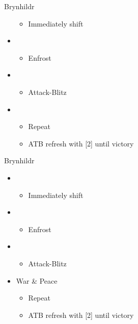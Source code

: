 \begin{paracol}{2}
\begin{battle}{Brynhildr}
\begin{itemize}
\begin{itemize}
				      \item Immediately shift
			      \end{itemize}
			\item \third
			      \begin{itemize}
				      \item Enfrost
			      \end{itemize}
			\item \first
			      \begin{itemize}
				      \item Attack-Blitz
			      \end{itemize}
			\item \second
			      \begin{itemize}
				      \item Repeat
				      \item ATB refresh with [2] until victory
			      \end{itemize}
		\end{itemize}
	\end{battle}
	\switchcolumn
	\begin{battle}{Brynhildr}
		\begin{itemize}
			\item \first
			      \begin{itemize}
				      \item Immediately shift
			      \end{itemize}
			\item \third
			      \begin{itemize}
				      \item Enfrost
			      \end{itemize}
			\item \first
			      \begin{itemize}
				      \item Attack-Blitz
			      \end{itemize}
			\item War \& Peace
			      \begin{itemize}
				      \item Repeat
				      \item ATB refresh with [2] until victory
			      \end{itemize}
		\end{itemize}
	\end{battle}

\end{paracol}